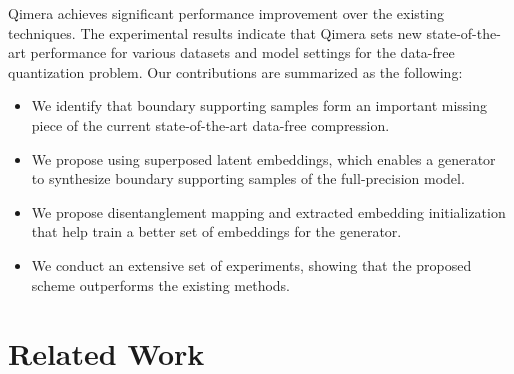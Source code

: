 \documentclass{article}
\newcommand{\aname}{Qimera\xspace}
\newcommand{\JL}[1]{{\color{magenta}[\textbf{\sc JLee}: \textit{#1}]}}
\renewcommand{\JL}[1]{}
\begin{document}
\aname achieves significant performance improvement over the existing techniques. 
The experimental results indicate that \aname sets new state-of-the-art performance for various datasets and model settings for the data-free quantization problem. 
Our contributions are summarized as the following:
\begin{itemize}
    \item We identify that boundary supporting samples form an important missing piece of the current state-of-the-art data-free compression. 
    \item We propose using superposed latent embeddings, which enables a generator to synthesize boundary supporting samples of the full-precision model.
    \item We propose disentanglement mapping and extracted embedding initialization that help train a better set of embeddings for the generator.
    \item We conduct an extensive set of experiments, showing that the proposed scheme outperforms the existing methods.
\end{itemize}


\JL{maybe itemized contributions}





\section{Related Work}
\end{document}
